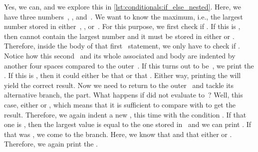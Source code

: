 Yes, we can, and we explore this in \cref{lst:conditionals:if_else_nested}.
Here, we have three numbers~, , and~.
We want to know the maximum, i.e., the largest number stored in either~, , or~.
For this purpose, we first check if \pythonIdx{>}.
If this is , then  cannot contain the largest number and it must be stored in either  or .
Therefore, inside the body of that first ~statement, we only have to check if .
Notice how this second~ and its whole associated  and body are indented by another four spaces compared to the outer~.
If this turns out to be~, we print the  .
If this is , then it could either be that  or that .
Either way, printing the   will yield the correct result.
Now we need to return to the outer~ and tackle its alternative branch, the  part.
What happens if  did not evaluate to~?
Well, this case, either  or , which means that it is sufficient to compare  with  to get the result.
Therefore, we again indent a new , this time with the condition .
If that one is , then the largest value is equal to the one stored in~ and we can print .
If that was , we come to the  branch.
Here, we know that  and that either  or .
Therefore, we again print the  .

